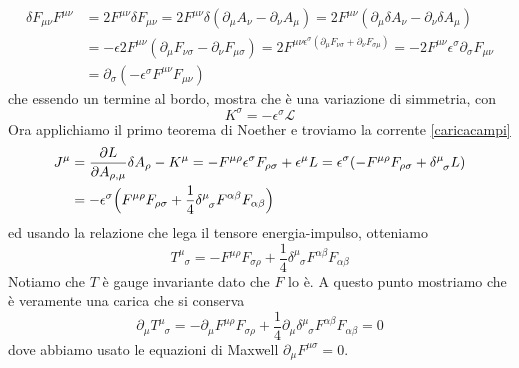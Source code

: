 \begin{equation*}
\begin{aligned}
    \delta F_{\mu\nu} F^{\mu\nu} & = 2 F^{\mu\nu} \delta F_{\mu\nu} = 2 F^{\mu\nu} \delta (\partial_\mu A_\nu - \partial_\nu A_\mu) = 2 F^{\mu\nu} (\partial_\mu \delta A_\nu - \partial_\nu \delta A_\mu) \\ & = - \epsilon 2 F^{\mu\nu} (\partial_\mu F_{\nu\sigma}  - \partial_\nu F_{\mu\sigma}) = 2 F^{\mu\nu \epsilon^\sigma (\partial_\mu F_{\nu\sigma} + \partial_\nu F_{\sigma\mu})} = - 2 F^{\mu\nu} \epsilon^\sigma \partial_\sigma F_{\mu\nu} \\ & = \partial_\sigma (-\epsilon^\sigma F^{\mu\nu} F_{\mu\nu})
\end{aligned}
\end{equation*}
    che essendo un termine al bordo, mostra che è una variazione di simmetria, con 
\begin{equation*}
    K^\sigma = -\epsilon^\sigma \mathcal L
\end{equation*}
    Ora applichiamo il primo teorema di Noether e troviamo la corrente \eqref{caricacampi} 
\begin{equation*}
\begin{aligned}
    J^\mu & = \pdv{L}{A_{\rho,\mu}} \delta A_\rho - K^\mu = - F^{\mu\rho} \epsilon^\sigma F_{\rho\sigma} + \epsilon^\mu L = \epsilon^\sigma (- F^{\mu\rho} F_{\rho \sigma} + \delta^\mu_{\phantom \mu \sigma} L ) \\ & = - \epsilon^\sigma \Big ( F^{\mu\rho} F_{\rho\sigma} + \frac{1}{4} \delta^\mu_{\phantom \mu \sigma} F^{\alpha \beta} F_{\alpha \beta} \Big)
\end{aligned}
\end{equation*}
    ed usando la relazione che lega il tensore energia-impulso, otteniamo 
\begin{equation*}
    T^\mu_{\phantom \mu \sigma} = - F^{\mu\rho} F_{\sigma\rho} + \frac{1}{4} \delta^\mu_{\phantom \mu \sigma} F^{\alpha \beta} F_{\alpha \beta}
\end{equation*}
    Notiamo che $T$ è gauge invariante dato che $F$ lo è. A questo punto mostriamo che è veramente una carica che si conserva
\begin{equation*}
    \partial_\mu T^\mu_{\phantom \mu \sigma} = - \partial_\mu F^{\mu\rho} F_{\sigma\rho} + \frac{1}{4} \partial_\mu \delta^\mu_{\phantom \mu \sigma} F^{\alpha \beta} F_{\alpha \beta} = 0
\end{equation*} 
    dove abbiamo usato le equazioni di Maxwell $\partial_\mu F^{\mu\sigma} = 0$.

